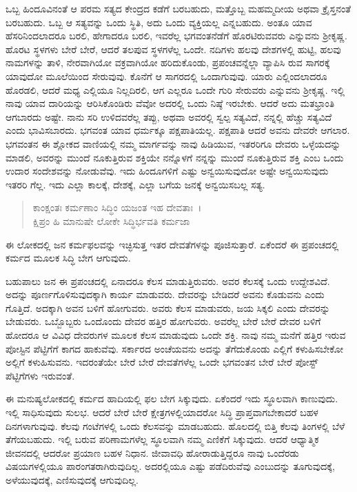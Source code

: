 ಒಬ್ಬ ಹಿಂದೂವಿನಂತೆ ಆ ಪರಮ ಸತ್ಯದ ಕೇಂದ್ರದ ಕಡೆಗೆ ಬರಬಹುದು, ಮತ್ತೊಬ್ಬ ಮಹಮ್ಮದೀಯ ಅಥವಾ ಕ್ರೈಸ್ತನಂತೆ ಬರಬಹುದು. ಒಬ್ಬ ಆ ಸತ್ಯವನ್ನು ಒಂದು ಸ್ಥಿತಿ, ಅದು ಒಂದು ವ್ಯಕ್ತಿಯಲ್ಲ ಎನ್ನಬಹುದು. ಅಂತೂ ಯಾವ ಹೆಸರಿನಿಂದಲಾದರೂ ಬರಲಿ, ಹೇಗಾದರೂ ಬರಲಿ, ಇವರೆಲ್ಲ ಭಗವಂತನೆಡೆಗೆ ಹೊರಟಿರುವವರು ಎನ್ನುವನು ಶ‍್ರೀಕೃಷ್ಣ. ಹೊರಟ ಸ್ಥಳಗಳು ಬೇರೆ ಬೇರೆ, ಆದರೆ ತಲಪುವ ಸ್ಥಳಗಳೆಲ್ಲ ಒಂದೇ. ನದಿಗಳು ಹಲವು ದೇಶಗಳಲ್ಲಿ ಹುಟ್ಟಿ, ಹಲವು ನಾಮಗಳನ್ನು ತಾಳಿ, ನೇರವಾಗಿಯೋ ವಕ್ರವಾಗಿಯೋ ಹರಿದುಕೊಂಡು, ಪ್ರಪಂಚವನ್ನೆಲ್ಲಾ ವ್ಯಾಪಿಸಿ ರುವ ಸಾಗರಕ್ಕೆ ಯಾವುದೋ ಮೂಲೆಯಿಂದ ಸೇರುವುವು. ಕೊನೆಗೆ ಆ ಸಾಗರದಲ್ಲಿ ಒಂದಾಗುವುವು. ಯಾರು ಎಲ್ಲಿಂದಲಾದರೂ ಹೊರಡಲಿ, ಆದರೆ ಮಧ್ಯ ಎಲ್ಲಿಯೂ ನಿಲ್ಲದಿರಲಿ, ಆಗ ಎಲ್ಲರೂ ಒಂದೇ ಗುರಿ ಸೇರುವರು ಎನ್ನುವನು ಶ‍್ರೀಕೃಷ್ಣ. ಇಲ್ಲಿ ನಾವು ಯಾವ ದಾರಿಯನ್ನು ಆರಿಸಿಕೊಂಡಿರು ವೆವೋ ಅದರಲ್ಲಿ ಒಂದು ನಿಷ್ಠೆ ಇರಬೇಕು. ಆದರೆ ಅದು ಮತಭ್ರಾಂತಿ ಆಗಬಾರದು ಅಷ್ಟೇ. ನಾನು ಸರಿ ಉಳಿದವರೆಲ್ಲ ತಪ್ಪು, ಅಥವಾ ಅವರಲ್ಲಿ ಸ್ವಲ್ಪ ಸತ್ಯವಿದೆ, ನನ್ನಲ್ಲಿ ಹೆಚ್ಚು ಸತ್ಯವಿದೆ ಎಂದು ಭಾವಿಸಬಾರದು. ಭಗವಂತ ಯಾವ ಧರ್ಮಕ್ಕೂ ಪಕ್ಷಪಾತಿಯಲ್ಲ. ಪಕ್ಷಪಾತಿ ಆದರೆ ಅವನು ದೇವರೇ ಆಗಲಾರ. ಭಗವಂತನ ಈ ಶ್ಲೋಕದ ವಾಣಿಯಲ್ಲಿ ನಮ್ಮ ಮಾರ್ಗವನ್ನು ನಾವು ಹಿಡಿಯುವ, ಇತರರಿಗೂ ದೇವರು ಒಳ್ಳೆಯದನ್ನು ಮಾಡಲಿ, ಅವರನ್ನು ಮುಂದೆ ನೂಕುತ್ತಿರುವ ಶಕ್ತಿಯೇ ನನ್ನೊಳಗೆ ನನ್ನನ್ನು ಮುಂದೆ ನೂಕುತ್ತಿರುವ ಶಕ್ತಿ ಎಂಬ ಒಂದು ಉದಾರ ಸಂದೇಶವನ್ನು ನೋಡುವೆವು. ಇದು ಹಿಂದೂಗಳಿಗೆ ಎಷ್ಟು ಅನ್ವಯಿಸುವುದೋ ಅಷ್ಟೇ ಅನ್ವಯಿಸುವುದು ಇತರರಿ ಗೆಲ್ಲ. ಇದು ಎಲ್ಲಾ ಕಾಲಕ್ಕೆ, ದೇಶಕ್ಕೆ, ಎಲ್ಲಾ ಬಗೆಯ ಜನಕ್ಕೆ ಅನ್ವಯಿಸಬಲ್ಲ ಸತ್ಯ.

\begin{verse}
ಕಾಂಕ್ಷಂತಃ ಕರ್ಮಣಾಂ ಸಿದ್ಧಿಂ ಯಜಂತ ಇಹ ದೇವತಾಃ~।\\ಕ್ಷಿಪ್ರಂ ಹಿ ಮಾನುಷೇ ಲೋಕೇ ಸಿದ್ಧಿರ್ಭವತಿ ಕರ್ಮಜಾ 
\end{verse}

{\small ಈ ಲೋಕದಲ್ಲಿ ಜನ ಕರ್ಮಫಲವನ್ನು ಇಚ್ಛಿಸುತ್ತ ಇತರ ದೇವತೆಗಳನ್ನು ಪೂಜಿಸುತ್ತಾರೆ. ಏಕೆಂದರೆ ಈ ಪ್ರಪಂಚದಲ್ಲಿ ಕರ್ಮದ ಮೂಲಕ ಸಿದ್ಧಿ ಬೇಗ ಆಗುವುದು.}

ಬಹುಪಾಲು ಜನ ಈ ಪ್ರಪಂಚದಲ್ಲಿ ಏನಾದರೂ ಕೆಲಸ ಮಾಡುತ್ತಿರುವರು. ಅವರ ಕೆಲಸಕ್ಕೆ ಒಂದು ಉದ್ದೇಶವಿದೆ. ಅದನ್ನು ಪೂರ್ಣಗೊಳಿಸುವುದಕ್ಕಾಗಿ ಕಾರ್ಯ ಮಾಡುವರು. ದೇವರನ್ನು ಬೇಡಿದರೆ ಅವನು ಕೊಡುವನು ಎಂದು ಗೊತ್ತಿದೆ. ಅದಕ್ಕಾಗಿ ಅವನ ಬಳಿಗೆ ಹೋಗುವರು. ಅವರು ಕೆಲಸ ಮಾಡುವರು, ಜಯ ಸಿಕ್ಕಲಿ ಎಂದು ದೇವರನ್ನು ಬೇಡುವರು. ಒಬ್ಬೊಬ್ಬರು ಒಂದೊಂದು ದೇವರ ಹತ್ತಿರ ಹೋಗುವರು. ಅವರೆಲ್ಲ ಬೇರೆ ಬೇರೆ ದೇವರ ಬಳಿಗೆ ಹೋದರೂ ಆ ವಿವಿಧ ದೇವರುಗಳ ಮೂಲಕ ಕೆಲಸ ಮಾಡುವುದು ಒಂದೇ ಶಕ್ತಿ. ನಾವು ನಮ್ಮ ಮನೆಗೆ ಹತ್ತಿರ ಇರುವ ಪೋಸ್ಟಿನ ಪೆಟ್ಟಿಗೆಗೆ ಕಾಗದ ಹಾಕುವೆವು. ಸರ್ಕಾರದ ಅಂಚೆಯವನು ಅದನ್ನು ತೆಗೆದುಕೊಂಡು ಎಲ್ಲಿಗೆ ಕಳುಹಿಸಬೇಕೋ ಅಲ್ಲಿಗೆ ಕಳುಹಿಸುವನು. ಇದರಂತೆಯೇ ಬೇರೆ ಬೇರೆ ದೇವತೆಗಳೆಲ್ಲ ಒಂದೇ ಭಗವಂತನ ಬೇರೆ ಬೇರೆ ಪೋಸ್ಟ್ ಪೆಟ್ಟಿಗೆಗಳು ಇರುವಂತೆ.

ಈ ಮನುಷ್ಯಲೋಕದಲ್ಲಿ ಕರ್ಮದ ಹಾದಿಯಲ್ಲಿ ಫಲ ಬೇಗ ಸಿಕ್ಕುವುದು. ಏಕೆಂದರೆ ಇದು ಸ್ಥೂಲವಾಗಿ ಕಾಣುವುದು. ಇಲ್ಲಿ ಸಾಧಿಸುವುದು ಸುಲಭ. ಆದರೆ ಬೇರೆ ಬೇರೆ ಕ್ಷೇತ್ರಗಳಲ್ಲಿಯಾದರೋ ಸಿದ್ಧಿ ಪ್ರಾಪ್ತವಾಗಬೇಕಾದರೆ ಬಹಳ ದಿನಗಳಾಗುವುವು. ಕೆಲವು ಗಂಟೆಗಳಲ್ಲಿ ಒಂದು ಕೆಲಸವನ್ನು ಮಾಡಬಹುದು. ಹೊಲದಲ್ಲಿ ಬಿತ್ತಿ ಕೆಲವು ತಿಂಗಳಲ್ಲಿ ಬೆಳೆ ತೆಗೆಯಬಹುದು. ಇಲ್ಲಿ ಬರುವ ಪರಿಣಾಮಗಳೆಲ್ಲ ಸ್ಥೂಲವಾಗಿ ನಮ್ಮ ಎಣಿಕೆಗೆ ಸಿಕ್ಕುವುದು. ಆದರೆ ಆಧ್ಯಾತ್ಮಿಕ ಜೀವನದಲ್ಲಿ ಆದರೋ ಪ್ರಯಾಣ ಬಹಳ ನಿಧಾನ. ಜೀವಾವಧಿ ಹೋರಾಡುತ್ತಿದ್ದರೂ ನಾವು ಒಂದೆರಡು ವಿಷಯಗಳಲ್ಲಿಯೂ ಪಾರಂಗತರಾಗಿರುವುದಿಲ್ಲ. ಅದರಲ್ಲಿಯೂ ಎಷ್ಟು ಪಡೆದಿರುವೆವು ಎಂಬುದನ್ನು ತೂಗುವುದಕ್ಕೆ, ಅಳೆಯುವುದಕ್ಕೆ, ಎಣಿಸುವುದಕ್ಕೆ ಆಗುವುದಿಲ್ಲ.

